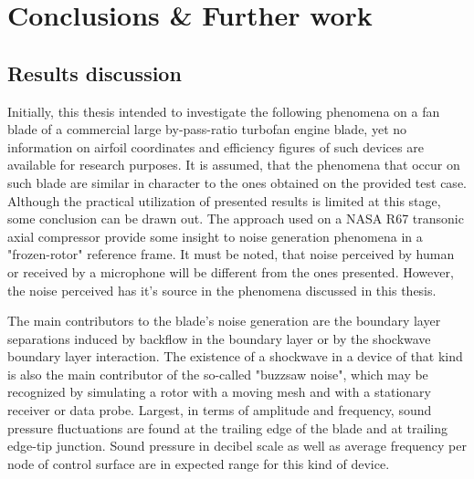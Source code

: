 
\chapter{Conclusions \& Further work} %

\label{conclusions} %


\section{Results discussion}
Initially, this thesis intended to investigate the following phenomena on a fan blade of a commercial large by-pass-ratio turbofan engine blade, yet no information on airfoil coordinates and efficiency figures of such devices are available for research purposes. It is assumed, that the phenomena that occur on such blade are similar in character to the ones obtained on the provided test case. Although the practical utilization of presented results is limited at this stage, some conclusion can be drawn out. The approach used on a NASA R67 transonic axial compressor provide some insight to noise generation phenomena in a "frozen-rotor" reference frame. It must be noted, that noise perceived by human or received by a microphone will be different from the ones presented. However, the noise perceived has it's source in the phenomena discussed in this thesis.

The main contributors to the blade's noise generation are the boundary layer separations induced by backflow in the boundary layer or by the shockwave boundary layer interaction. The existence of a shockwave in a device of that kind is also the main contributor of the so-called "buzzsaw noise", which may be recognized by simulating a rotor with a moving mesh and with a stationary receiver or data probe. Largest, in terms of amplitude and frequency, sound pressure fluctuations are found at the trailing edge of the blade and at trailing edge-tip junction. Sound pressure in decibel scale as well as average frequency per node of control surface are in expected range for this kind of device.

